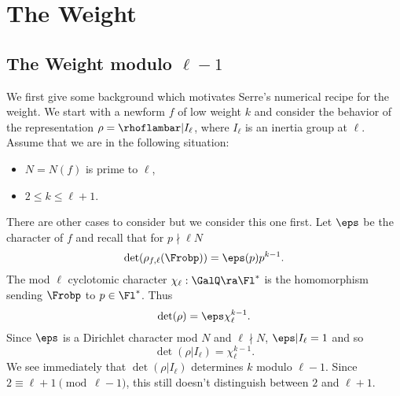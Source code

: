 \documentclass{report}
\begin{document}
\section{The Weight}
\subsection{The Weight modulo $\ell-1$}
We first give some background which motivates
Serre's numerical recipe for the weight.
We start with a newform $f$ of low weight $k$ and consider the
behavior of the representation $\rho=\rhoflambar|I_{\ell}$, where
$I_{\ell}$ is an inertia group at $\ell$.  Assume that we
are in the following situation:
\begin{itemize}
\item $N=N(f)$ is prime to $\ell$,
\item $2\leq k\leq \ell+1$.
\end{itemize}
There are other cases to consider but we consider this one first.
Let $\eps$ be the character of $f$ and recall that for $p\nmid \ell N$
$$\det(\rho_{f,\ell}(\Frobp)) = \eps(p)p^{k-1}.$$
The mod $\ell$ cyclotomic character $\chi_{\ell}:\GalQ\ra\Fl^*$ is the
homomorphism sending $\Frobp$ to $p\in\Fl^*$. Thus
$$\det(\rho) = \eps\chi_{\ell}^{k-1}.$$
Since $\eps$ is a Dirichlet character mod $N$ and $\ell\nmid N$,
$\eps|I_{\ell}=1$ and so
   $$\det(\rho|I_{\ell})=\chi_{\ell}^{k-1}.$$
We see immediately that $\det(\rho|I_{\ell})$ determines $k$ modulo $\ell-1$.
Since $2\equiv\ell+1\pmod{\ell-1}$, this still doesn't distinguish
between $2$ and $\ell+1$.
\end{document}
